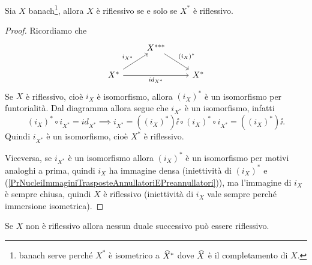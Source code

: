 \begin{proposition}\label{PrBanachERiflessivoSSEIlDualeERiflessivo}
Sia $X$ banach\footnote{banach serve perch\'e $X^\ast$ \`e isometrico a $\widehat{X}^\ast$ dove $\widehat{X}$ \`e il completamento di $X$.}, allora $X$ \`e riflessivo se e solo se $X^\ast$ \`e riflessivo.
\end{proposition}
\begin{proof}
Ricordiamo che
\[\begin{tikzcd}
	& {X^{\ast\ast\ast}} \\
	{X^\ast} && {X^\ast}
	\arrow["{(i_X)^\ast}", from=1-2, to=2-3]
	\arrow["{i_{X^\ast}}", from=2-1, to=1-2]
	\arrow["{id_{X^\ast}}"', from=2-1, to=2-3]
\end{tikzcd}\]
Se $X$ \`e riflessivo, cio\`e $i_X$ \`e isomorfismo, allora $(i_X)^\ast$ \`e un isomorfismo per funtorialit\`a. Dal diagramma allora segue che $i_{X^\ast}$ \`e un isomorfismo, infatti
\[(i_X)^\ast\circ i_{X^\ast}=id_{X^\ast}\implies i_{X^\ast}=((i_X)^\ast)\ii\circ (i_X)^\ast\circ i_{X^\ast} = ((i_X)^\ast)\ii.\]
Quindi $i_{X^\ast}$ \`e un isomorfismo, cio\`e $X^\ast$ \`e riflessivo.


Viceversa, se $i_{X^\ast}$ \`e un isomorfismo allora $(i_X)^\ast$ \`e un isomorfismo per motivi analoghi a prima, quindi $i_X$ ha immagine densa (iniettivit\`a di $(i_X)^\ast$ e (\ref{PrNucleiImmaginiTrasposteAnnullatoriEPreannullatori})), ma l'immagine di $i_X$ \`e sempre chiusa, quindi $X$ \`e riflessivo (iniettivit\`a di $i_X$ vale sempre perch\'e immersione isometrica). 
\end{proof}

\begin{remark}
Se $X$ non \`e riflessivo allora nessun duale successivo pu\`o essere riflessivo.
\end{remark}



